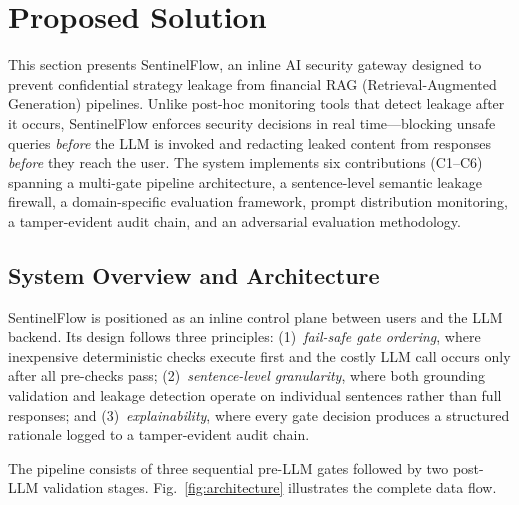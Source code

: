 \documentclass[journal,12pt,onecolumn,draftclsnofoot]{IEEEtran}
\begin{document}
\section{Proposed Solution}
\label{Sect:Proposed_Solution}
%
This section presents SentinelFlow, an inline AI security gateway designed to prevent confidential strategy leakage from financial RAG (Retrieval-Augmented Generation) pipelines. Unlike post-hoc monitoring tools that detect leakage after it occurs, SentinelFlow enforces security decisions in real time---blocking unsafe queries \textit{before} the LLM is invoked and redacting leaked content from responses \textit{before} they reach the user. The system implements six contributions (C1--C6) spanning a multi-gate pipeline architecture, a sentence-level semantic leakage firewall, a domain-specific evaluation framework, prompt distribution monitoring, a tamper-evident audit chain, and an adversarial evaluation methodology.


\subsection{System Overview and Architecture}
\label{Sect:System_Overview}

SentinelFlow is positioned as an inline control plane between users and the LLM backend. Its design follows three principles: (1)~\textit{fail-safe gate ordering}, where inexpensive deterministic checks execute first and the costly LLM call occurs only after all pre-checks pass; (2)~\textit{sentence-level granularity}, where both grounding validation and leakage detection operate on individual sentences rather than full responses; and (3)~\textit{explainability}, where every gate decision produces a structured rationale logged to a tamper-evident audit chain.

The pipeline consists of three sequential pre-LLM gates followed by two post-LLM validation stages. Fig.~\ref{fig:architecture} illustrates the complete data flow.
\end{document}
